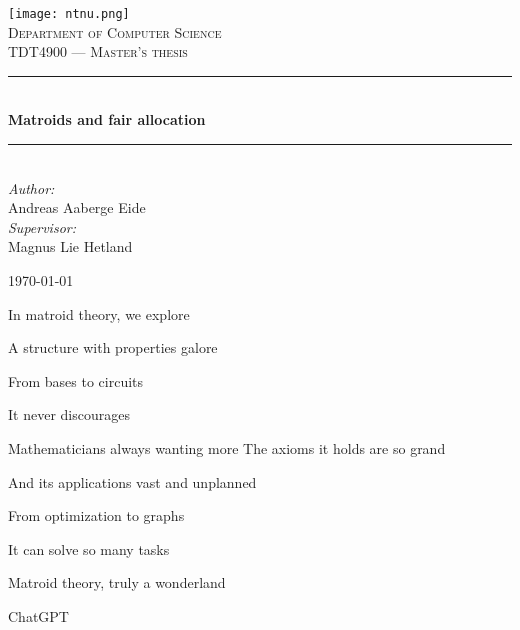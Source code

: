 \documentclass[b5paper]{report}
\begin{document}
\newcommand{\mono}[1]{$\texttt{#1}$}

\begin{titlepage}
  \newcommand{\HRule}{\rule{\linewidth}{0.5mm}}

  \vbox{ }
  \vbox{ }
  \begin{center}
    \texttt{[image: ntnu.png]}\\[1cm]
    \textsc{\Large Department of Computer Science}\\[1.5cm]
    \textsc{\large TDT4900 --- Master's thesis}\\[0.5cm]
    \vbox{ }

    \HRule \\[0.4cm]
    { \huge \bfseries Matroids and fair allocation}\\[0.4cm]
    \HRule \\[1.5cm]

    \large
    \emph{Author:}\\
    Andreas Aaberge Eide\\[0.5cm]
    \emph{Supervisor:}\\
    Magnus Lie Hetland
    \vfill

    {\large \today\par}
  \end{center}
\end{titlepage}


\epigraph{In matroid theory, we explore

A structure with properties galore

From bases to circuits

It never discourages

Mathematicians always wanting more
\newline
\newline
The axioms it holds are so grand

And its applications vast and unplanned

From optimization to graphs

It can solve so many tasks

Matroid theory, truly a wonderland}{ChatGPT}










\tableofcontents




% 
% 
% 
% 
\end{document}
